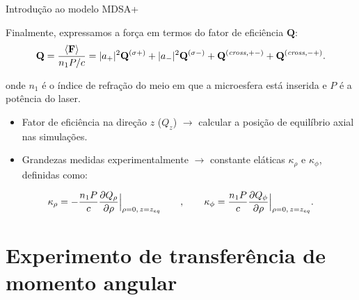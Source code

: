 \documentclass[10pt]{beamer}
\begin{document}
\begin{frame}[fragile]{Introdução ao modelo MDSA+}

    \begin{center}
        Finalmente, expressamos a força em termos do fator de eficiência $\mathbf{Q}$:
        \begin{equation}
        {\mathbf Q} = \frac{\left<{\mathbf F}\right>}{n_1 P/c}= |a_+|^2{\mathbf Q}^{(\sigma +)} + |a_-|^2{\mathbf Q}^{(\sigma -)} + {\mathbf Q}^{({\it cross},+-)} + {\mathbf Q}^{({\it cross},-+)}.
        \end{equation}
        
        onde $n_1$ é o índice de refração do meio em que a microesfera está inserida e $P$ é a potência do laser.
        \begin{itemize}

        	\item Fator de eficiência na direção $z$ ($Q_z$) $\rightarrow$ calcular a posição de equilíbrio axial nas simulações. 

        	\item Grandezas medidas experimentalmente $\rightarrow$ constante eláticas $\kappa_\rho$ e $\kappa_\phi$, definidas como:
        \end{itemize}

        \begin{equation}
        \kappa_\rho=-\frac{n_1 P}{c}\frac{\partial Q_\rho}{\partial \rho}\Big{|}_{\rho=0, \thinspace z=z_{eq}} \qquad, \qquad \kappa_\phi=\frac{n_1 P}{c}\frac{\partial Q_\phi}{\partial \rho}\Big{|}_{\rho=0, \thinspace z=z_{eq}}.
        \end{equation}
%
    \end{center}

\end{frame}


\section{Experimento de transferência de momento angular}

\end{document}
